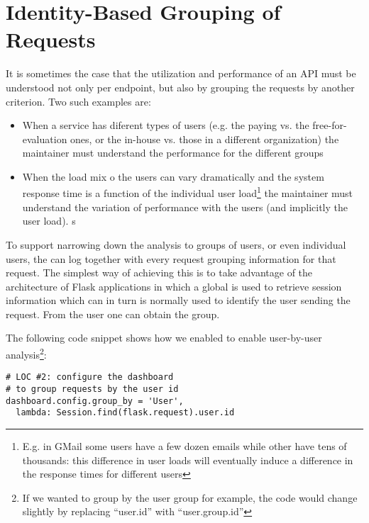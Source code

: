 
\section{Identity-Based Grouping of Requests}
\label{sec:grouping}

It is sometimes the case that the utilization and performance of an API must be understood not only per endpoint, but also by grouping the requests by another criterion. Two such examples are: 
\begin{itemize}
	\item When a service has diferent types of users (e.g. the paying vs. the free-for-evaluation ones, or the in-house vs. those in a different organization) the maintainer must understand the performance for the different groups
	\item When the load mix o the users can vary dramatically and the system response time is a function of the individual user load\footnote{E.g. in GMail some users have a few dozen emails while other have tens of thousands: this difference in user loads will eventually induce a difference in the response times for different users} the maintainer must understand the variation of performance with the users (and implicitly the user load). s
\end{itemize}

To support narrowing down the analysis to groups of users, or even individual users, the \tool can log together with every request grouping information for that request. The simplest way of achieving this is to take advantage of the architecture of Flask applications in which a global  is used to retrieve session information which can in turn is normally used to identify the user sending the request. From the user one can obtain the group. 

\niceseparator

The following code snippet shows how we enabled \tool to enable user-by-user analysis\footnote{If we wanted to group by the user group for example, the code would change slightly by replacing ``user.id'' with ``user.group.id''}: 

\begin{lstlisting}[style=custompython]  
# LOC #2: configure the dashboard
# to group requests by the user id
dashboard.config.group_by = 'User',
  lambda: Session.find(flask.request).user.id

\end{lstlisting}

